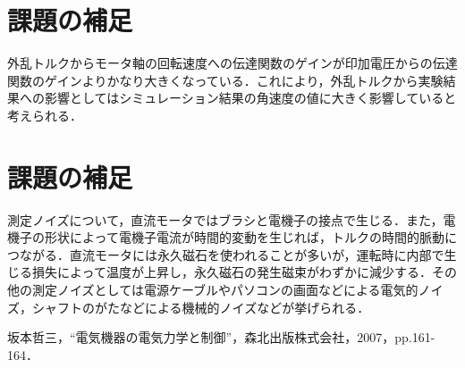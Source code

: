 \documentclass[11pt,a4paper]{jsarticle}
\begin{document}
\section{課題の補足}
外乱トルクからモータ軸の回転速度への伝達関数のゲインが印加電圧からの伝達関数のゲインよりかなり大きくなっている．これにより，外乱トルクから実験結果への影響としてはシミュレーション結果の角速度の値に大きく影響していると考えられる．

\newpage
\thispagestyle{fancy}
\cfoot{}

\setcounter{section}{7}
\section{課題の補足}
測定ノイズについて，直流モータではブラシと電機子の接点で生じる．また，電機子の形状によって電機子電流が時間的変動を生じれば，トルクの時間的脈動につながる．直流モータには永久磁石を使われることが多いが，運転時に内部で生じる損失によって温度が上昇し，永久磁石の発生磁束がわずかに減少する．その他の測定ノイズとしては電源ケーブルやパソコンの画面などによる電気的ノイズ，シャフトのがたなどによる機械的ノイズなどが挙げられる．


\begin{thebibliography}{1}
 坂本哲三，``電気機器の電気力学と制御''，森北出版株式会社，2007，pp.161-164．
\end{thebibliography}
\end{document}

